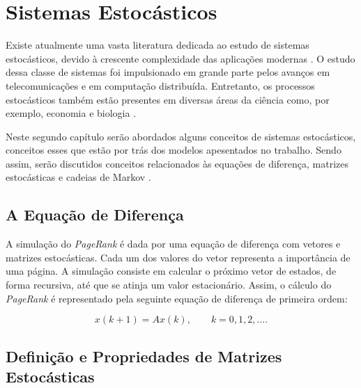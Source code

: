 \chapter{Sistemas Estocásticos}%

Existe atualmente uma vasta literatura dedicada ao estudo de sistemas estocásticos, devido à crescente complexidade das aplicações modernas \cite{mixed2010, Djudd12}. O estudo dessa classe de sistemas foi impulsionado em grande parte pelos avanços em telecomunicações e em computação distribuída. Entretanto, os processos estocásticos também estão presentes em diversas áreas da ciência como, por exemplo, economia e biologia \cite{bremaud}.

Neste segundo capítulo serão abordados alguns conceitos de sistemas estocásticos, conceitos esses que estão por trás dos modelos apesentados no trabalho. Sendo assim, serão discutidos conceitos relacionados às equações de diferença, matrizes estocásticas e cadeias de Markov \cite{costafragosotodorov,haggs}.



\section{A Equação de Diferença}%

A simulação do \textit{PageRank} é dada por uma equação de diferença com vetores e matrizes estocásticas. Cada um dos valores do vetor representa a importância de uma página. A simulação consiste em calcular o próximo vetor de estados, de forma recursiva, até que se atinja um valor estacionário. Assim, o cálculo do \textit{PageRank} é representado pela seguinte equação de diferença de primeira ordem:

\begin{equation} \label{xA}
	x(k+1) = A x(k),\qquad k=0,1,2,\ldots.
\end{equation}


\section{Definição e Propriedades de Matrizes Estocásticas}%

